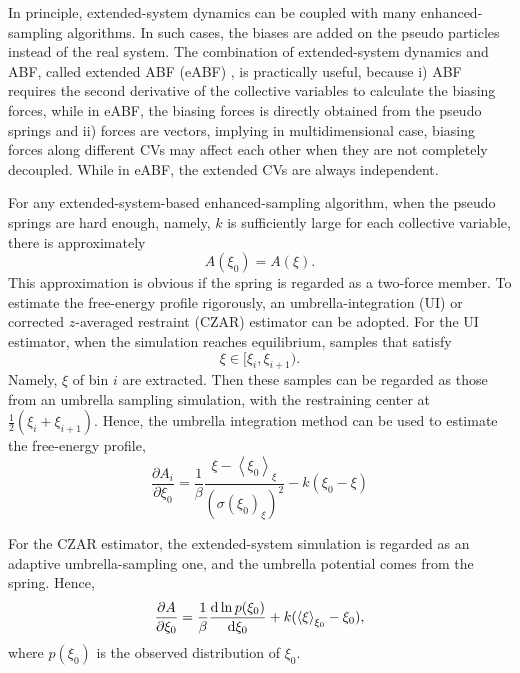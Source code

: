 In principle, extended-system dynamics can be coupled with many enhanced-sampling algorithms. In such cases, the biases are added on the pseudo particles instead of the real system. The combination of extended-system dynamics and ABF, called extended ABF (eABF) \cite{FuJCTC2016}, is practically useful, because i) ABF requires the second derivative of the collective variables to calculate the biasing forces, while in eABF, the biasing forces is directly obtained from the pseudo springs and ii) forces are vectors, implying in multidimensional case, biasing forces along different CVs may affect each other when they are not completely decoupled. While in eABF, the extended CVs are always independent.

For any extended-system-based enhanced-sampling algorithm, when the pseudo springs are hard enough, namely, $k$ is sufficiently large for each collective variable, there is approximately
\begin{equation}
	A(\xi_0)=A(\xi).
\end{equation}
This approximation is obvious if the spring is regarded as a two-force member. To estimate the free-energy profile rigorously, an umbrella-integration (UI)\cite{ZhengJCTC2012} or corrected $z$-averaged restraint (CZAR)\cite{LesageJPCB2017} estimator can be adopted. For the UI estimator, when the simulation reaches equilibrium, samples that satisfy
\begin{equation}
	\xi \in [\xi_{i}, \xi_{i+1}).
\end{equation}
Namely, $\xi$ of bin $i$ are extracted. Then these samples can be regarded as those from an umbrella sampling simulation, with the restraining center at $\frac{1}{2}(\xi_{i} + \xi_{i+1})$. Hence, the umbrella integration method can be used to estimate the free-energy profile,
\begin{equation}
	\frac{\partial A_{i}}{\partial \xi_{0}}=\frac{1}{\beta }\frac{\xi - \left \langle \xi_{0} \right \rangle_{\xi}}{(\sigma ( \xi_{0})_{\xi})^{2} }-k(\xi_{0} - \xi)
\end{equation}

For the CZAR estimator, the extended-system simulation is regarded as an adaptive umbrella-sampling one, and the umbrella potential comes from the spring. Hence,
\begin{equation}
	\frac{\partial A}{\partial \xi_0}=\frac{1}{\beta }\frac{\mathop{}\!\mathrm{d} \ln p(\xi_0)}{\mathop{}\!\mathrm{d} \xi_0} + k(\left \langle  \xi \right \rangle_{\xi_0}-\xi_0),
\end{equation}
where $p(\xi_0)$ is the observed distribution of $\xi_0$.
